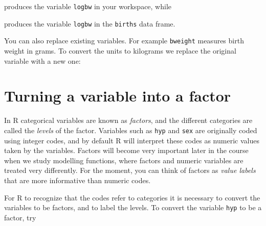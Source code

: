 \documentclass[
]{book}
\newenvironment{Shaded}{\begin{snugshade}}{\end{snugshade}}
\newcommand{\AttributeTok}[1]{\textcolor[rgb]{0.13,0.29,0.53}{#1}}
\newcommand{\DecValTok}[1]{\textcolor[rgb]{0.00,0.00,0.81}{#1}}
\newcommand{\FunctionTok}[1]{\textcolor[rgb]{0.13,0.29,0.53}{\textbf{#1}}}
\newcommand{\NormalTok}[1]{#1}
\newcommand{\OtherTok}[1]{\textcolor[rgb]{0.56,0.35,0.01}{#1}}
\newcommand{\SpecialCharTok}[1]{\textcolor[rgb]{0.81,0.36,0.00}{\textbf{#1}}}
\newcommand{\StringTok}[1]{\textcolor[rgb]{0.31,0.60,0.02}{#1}}
\begin{document}
produces the variable \texttt{logbw} in your workspace, while

\begin{Shaded}
\end{Shaded}

produces the variable \texttt{logbw} in the \texttt{births} data frame.

You can also replace existing variables. For example \texttt{bweight} measures
birth weight in grams. To convert the units to kilograms we replace the
original variable with a new one:

\begin{Shaded}
\end{Shaded}

\section{Turning a variable into a factor}\label{turning-a-variable-into-a-factor}

In R categorical variables are known as \emph{factors}, and the
different categories are called the \emph{levels} of the factor.
Variables such as \texttt{hyp} and \texttt{sex} are originally coded using
integer codes, and by default R will interpret these codes as numeric
values taken by the variables. Factors will become very important
later in the course when we study modelling functions, where
factors and numeric variables are treated very differently. For the moment,
you can think of factors as \emph{value labels} that are more informative
than numeric codes.

For R to recognize that the codes refer to categories it is necessary
to convert the variables to be factors, and to label the levels. To
convert the variable \texttt{hyp} to be a factor, try

\begin{Shaded}
\end{Shaded}
\end{document}

